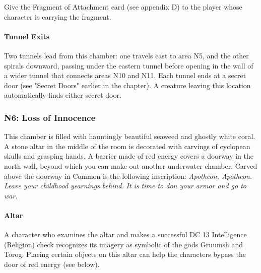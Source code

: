 \documentclass[10pt,a4,twoside,twocolumn,openany,nodeprecatedcode]{dndbook}
\begin{document}
Give the Fragment of Attachment card (see appendix D) to the player whose character is carrying the fragment.
\paragraph{Tunnel Exits}
Two tunnels lead from this chamber: one travels east to area N5, and the other spirals downward, passing under the eastern tunnel before opening in the wall of a wider tunnel that connects areas N10 and N11. Each tunnel ends at a secret door (see "Secret Doors" earlier in the chapter). A creature leaving this location automatically finds either secret door.
\subsubsection{N6: Loss of Innocence}
\begin{DndReadAloud}{}
This chamber is filled with hauntingly beautiful seaweed and ghostly white coral. A stone altar in the middle of the room is decorated with carvings of cyclopean skulls and grasping hands.
A barrier made of red energy covers a doorway in the north wall, beyond which you can make out another underwater chamber. Carved above the doorway in Common is the following inscription:
\textit{Apotheon, Apotheon}.
\textit{Leave your childhood yearnings behind.}
\textit{It is time to don your armor and go to war.}
\end{DndReadAloud}

\paragraph{Altar}
A character who examines the altar and makes a successful DC 13 Intelligence (Religion) check recognizes its imagery as symbolic of the gods Gruumsh and Torog. Placing certain objects on this altar can help the characters bypass the door of red energy (see below).
\end{document}
